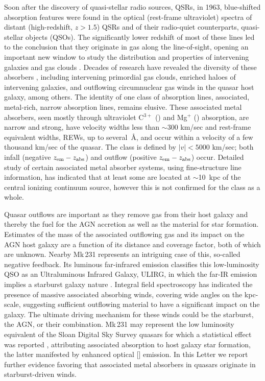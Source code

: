 \documentclass[preprint]{aastex}
\begin{document}
Soon after the discovery of quasi-stellar radio sources, QSRs, in 1963,
blue-shifted absorption features were found \citep{burbidge66} in the
optical (rest-frame ultraviolet) spectra of distant (high-redshift, $z >
1.5$) QSRs and of their radio-quiet counterparts, quasi-stellar objects
(QSOs).  The significantly lower redshift of most of these lines led to
the conclusion that they originate in gas along the line-of-sight,
opening an important new window to study the distribution and properties
of intervening galaxies and gas clouds \citep{blades88, weymann91}. 
Decades of research have revealed the diversity of these absorbers
\citep[e.g.,][]{bechtold02}, including intervening primordial gas
clouds, enriched haloes of intervening galaxies, and outflowing
circumnuclear gas winds in the quasar host galaxy, among others.  The
identity of one class of absorption lines, associated, metal-rich,
narrow absorption lines, remains elusive.  These associated metal
absorbers, seen mostly through ultraviolet C$^{3+}$ () and
Mg$^+$ () absorption, are narrow and strong, have velocity
widths less than $\sim300$ km/sec and rest-frame equivalent widths,
REWs, up to several~{\AA}, and occur \citep{foltz86, vester03} within a
velocity of a few thousand km/sec of the quasar.  The class is defined
by $\vert v \vert < 5000$ km/sec; both infall (negative $z_{\rm em}
-z_{\rm abs}$) and outflow (positive $z_{\rm em} -z_{\rm abs}$) occur. 
Detailed study \citep[e.g.,][]{williams75, sargent82, hamann01} of
certain associated metal absorber systems, using fine-structure line
information, has indicated that at least some are located at
$\sim$10~kpc of the central ionizing continuum source, however this is
not confirmed for the class as a whole. 

Quasar outflows are important as they remove gas from their host galaxy
and thereby the fuel for the AGN accretion as well as the material for
star formation.  Estimates of the mass of the associated outflowing gas
and its impact on the AGN host galaxy are a function of its distance and
coverage factor, both of which are unknown.  Nearby Mk\,231 represents
an intriguing case of this, so-called negative feedback.  Its luminous
far-infrared emission classifies this low-luminosity QSO as an
Ultraluminous Infrared Galaxy, ULIRG, in which the far-IR emission
implies a starburst galaxy nature \citep[e.g.,][]{surace98}.  Integral
field spectroscopy \citep{rupke13} has indicated the presence of massive
associated absorbing winds, covering wide angles on the kpc-scale,
suggesting sufficient outflowing material to have a significant impact
on the galaxy.  The ultimate driving mechanism for these winds could be
the starburst, the AGN, or their combination.  Mk\,231 may represent the
low luminosity equivalent of the Sloan Digital Sky Survey quasars for
which a statistical effect was reported \citep{shen12}, attributing
associated  absorption to host galaxy star formation, the
latter manifested by enhanced optical [] emission.  In this
Letter we report further evidence favoring that associated metal
absorbers in quasars originate in starburst-driven winds. 
\end{document}
